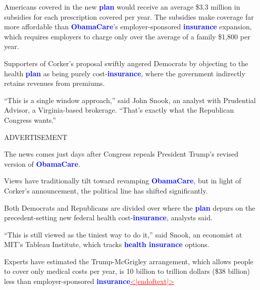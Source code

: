 \documentclass{article}
\begin{document}
\begin{samplebox}[title={\textsc{RePlaid} (s.c.), ancestral sampler, $T = 1024$ (GenPPL: $18.3$, Entropy: $5.21$, MAUVE: $0.85$)}]
\vspace{1em}
Americans covered in the new \textcolor{blue}{\textbf{plan}} would receive an average \$3.3 million in subsidies for each prescription covered per year. The subsidies make coverage far more affordable than \textcolor{blue}{\textbf{ObamaCare}}'s employer-sponsored \textcolor{blue}{\textbf{insurance}} expansion, which requires employers to charge only over the average of a family \$1,800 per year.

\vspace{1em}
Supporters of Corker's proposal swiftly angered Democrats by objecting to the health \textcolor{blue}{\textbf{plan}} as being purely cost-\textcolor{blue}{\textbf{insurance}}, where the government indirectly retains revenues from premiums.

\vspace{1em}
``This is a single window approach,'' said John Snook, an analyst with Prudential Advisor, a Virginia-based brokerage. ``That's exactly what the Republican Congress wants.''

\vspace{1em}
ADVERTISEMENT

\vspace{1em}
The news comes just days after Congress repeals President Trump's revised version of \textcolor{blue}{\textbf{ObamaCare}}.

\vspace{1em}
Views have traditionally tilt toward revamping \textcolor{blue}{\textbf{ObamaCare}}, but in light of Corker's announcement, the political line has shifted significantly.

\vspace{1em}
Both Democrats and Republicans are divided over where the \textcolor{blue}{\textbf{plan}} depurs on the precedent-setting new federal health cost-\textcolor{blue}{\textbf{insurance}}, analysts said.

\vspace{1em}
``This is still viewed as the tiniest way to do it,'' said Snook, an economist at MIT's Tableau Institute, which tracks \textcolor{blue}{\textbf{health insurance}} options.

\vspace{1em}
Experts have estimated the Trump-McGrigley arrangement, which allows people to cover only medical costs per year, is 10 billion to trillion dollars (\$38 billion) less than employer-sponsored \textcolor{blue}{\textbf{insurance}}\textcolor{red}{\uline{<|endoftext|>}}
\end{samplebox}

\clearpage
%
\end{document}
